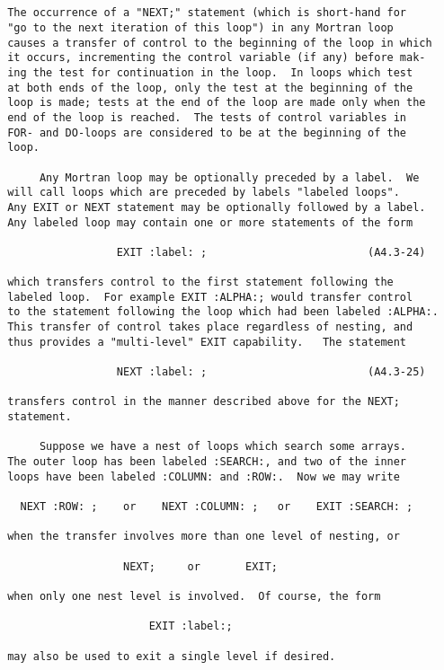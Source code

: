 \newpage \begin{verbatim}
 
 
 The occurrence of a "NEXT;" statement (which is short-hand for
 "go to the next iteration of this loop") in any Mortran loop
 causes a transfer of control to the beginning of the loop in which
 it occurs, incrementing the control variable (if any) before mak-
 ing the test for continuation in the loop.  In loops which test
 at both ends of the loop, only the test at the beginning of the
 loop is made; tests at the end of the loop are made only when the
 end of the loop is reached.  The tests of control variables in
 FOR- and DO-loops are considered to be at the beginning of the
 loop.
 
      Any Mortran loop may be optionally preceded by a label.  We
 will call loops which are preceded by labels "labeled loops".
 Any EXIT or NEXT statement may be optionally followed by a label.
 Any labeled loop may contain one or more statements of the form
 
                  EXIT :label: ;                         (A4.3-24)
 
 which transfers control to the first statement following the
 labeled loop.  For example EXIT :ALPHA:; would transfer control
 to the statement following the loop which had been labeled :ALPHA:.
 This transfer of control takes place regardless of nesting, and
 thus provides a "multi-level" EXIT capability.   The statement
 
                  NEXT :label: ;                         (A4.3-25)
 
 transfers control in the manner described above for the NEXT;
 statement.
 
      Suppose we have a nest of loops which search some arrays.
 The outer loop has been labeled :SEARCH:, and two of the inner
 loops have been labeled :COLUMN: and :ROW:.  Now we may write
 
   NEXT :ROW: ;    or    NEXT :COLUMN: ;   or    EXIT :SEARCH: ;
 
 when the transfer involves more than one level of nesting, or
 
                   NEXT;     or       EXIT;
 
 when only one nest level is involved.  Of course, the form
 
                       EXIT :label:;
 
 may also be used to exit a single level if desired.
\end{verbatim} 
